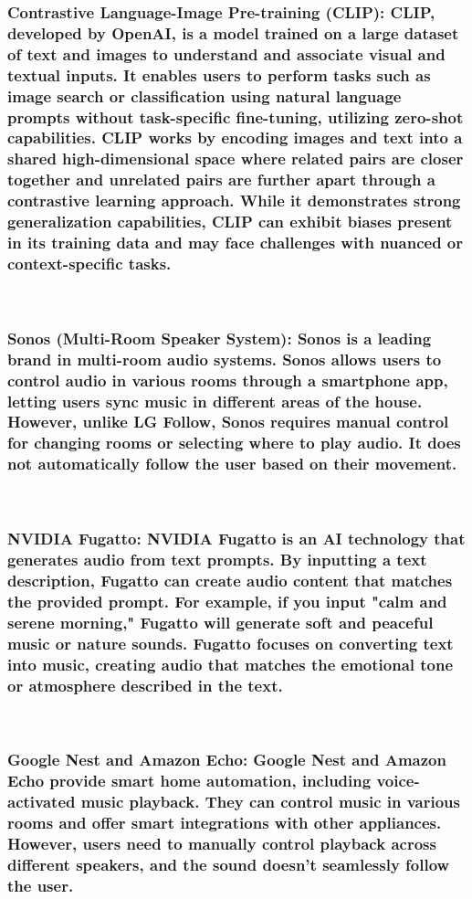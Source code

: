 \documentclass[conference]{IEEEtran}
\begin{document}
\subsubsection{Contrastive Language-Image Pre-training (CLIP): CLIP, developed by OpenAI, is a model trained on a large dataset of text and images to understand and associate visual and textual inputs. It enables users to perform tasks such as image search or classification using natural language prompts without task-specific fine-tuning, utilizing zero-shot capabilities. CLIP works by encoding images and text into a shared high-dimensional space where related pairs are closer together and unrelated pairs are further apart through a contrastive learning approach. While it demonstrates strong generalization capabilities, CLIP can exhibit biases present in its training data and may face challenges with nuanced or context-specific tasks.}

\
\subsubsection{Sonos (Multi-Room Speaker System): Sonos is a leading brand in multi-room audio systems. Sonos allows users to control audio in various rooms through a smartphone app, letting users sync music in different areas of the house. However, unlike LG Follow, Sonos requires manual control for changing rooms or selecting where to play audio. It does not automatically follow the user based on their movement.}

\
\subsubsection{NVIDIA Fugatto: NVIDIA Fugatto is an AI technology that generates audio from text prompts. By inputting a text description, Fugatto can create audio content that matches the provided prompt. For example, if you input "calm and serene morning," Fugatto will generate soft and peaceful music or nature sounds. Fugatto focuses on converting text into music, creating audio that matches the emotional tone or atmosphere described in the text.}
\

\subsubsection{Google Nest and Amazon Echo: Google Nest and Amazon Echo provide smart home automation, including voice-activated music playback. They can control music in various rooms and offer smart integrations with other appliances. However, users need to manually control playback across different speakers, and the sound doesn’t seamlessly follow the user. }
\end{document}
